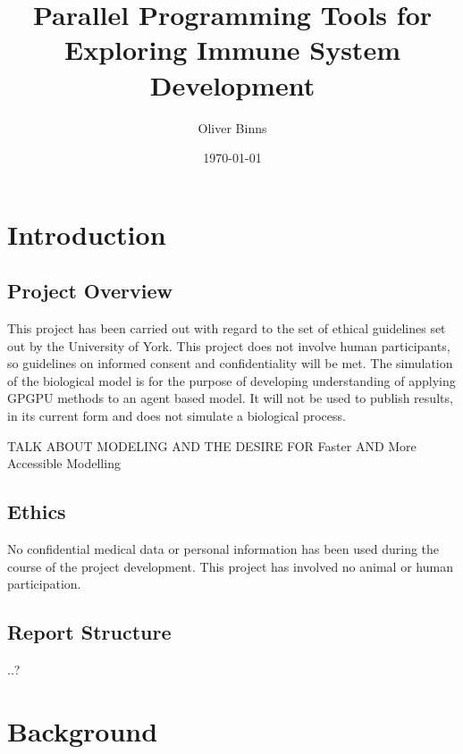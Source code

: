 \documentclass{UoYCSproject}
\title{Parallel Programming Tools for Exploring Immune System Development}
\author{Oliver Binns}
\date{\today}
\begin{document}
\maketitle
\listoffigures
\listoftables

\chapter{Introduction}
\section{Project Overview} %
This project has been carried out with regard to the set of ethical guidelines set out by the University of York. This project does not involve human participants, so guidelines on informed consent and confidentiality will be met. The simulation of the biological model is for the purpose of developing understanding of applying GPGPU methods to an agent based model. It will not be used to publish results, in its current form and does not simulate a biological process.


TALK ABOUT MODELING AND THE DESIRE FOR 
Faster AND More Accessible Modelling

\section{Ethics}
No confidential medical data or personal information has been used during the course of the project development.
This project has involved no animal or human participation.

\section{Report Structure}
..?

\chapter{Background}
%
\end{document}
